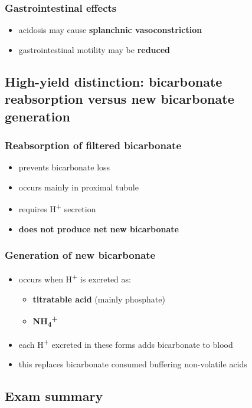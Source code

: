 \documentclass[11pt,a4paper]{article}
\begin{document}
\subsubsection{Gastrointestinal effects}

\begin{itemize}
  \item acidosis may cause \textbf{splanchnic vasoconstriction}
  \item gastrointestinal motility may be \textbf{reduced}
\end{itemize}

\subsection{High-yield distinction: bicarbonate reabsorption versus new bicarbonate generation}

\subsubsection{Reabsorption of filtered bicarbonate}
\begin{itemize}
  \item prevents bicarbonate loss
  \item occurs mainly in proximal tubule
  \item requires H\textsuperscript{+} secretion
  \item \textbf{does not produce net new bicarbonate}
\end{itemize}

\subsubsection{Generation of new bicarbonate}
\begin{itemize}
  \item occurs when H\textsuperscript{+} is excreted as:
  \begin{itemize}
    \item \textbf{titratable acid} (mainly phosphate)
    \item \textbf{NH\textsubscript{4}\textsuperscript{+}}
  \end{itemize}
  \item each H\textsuperscript{+} excreted in these forms adds bicarbonate to blood
  \item this replaces bicarbonate consumed buffering non-volatile acids
\end{itemize}

\subsection{Exam summary}
\end{document}
